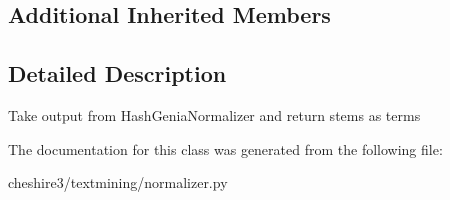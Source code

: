 \subsection*{Additional Inherited Members}


\subsection{Detailed Description}
\begin{DoxyVerb}Take output from HashGeniaNormalizer and return stems as terms \end{DoxyVerb}
 

The documentation for this class was generated from the following file\-:\begin{DoxyCompactItemize}
\item 
cheshire3/textmining/normalizer.\-py\end{DoxyCompactItemize}
